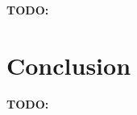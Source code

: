 \documentclass{article}
\newcommand{\todo}{\textbf{TODO:}}
\begin{document}
\todo

\section{Conclusion}
\label{sec:conclusion}

\todo




\end{document}
